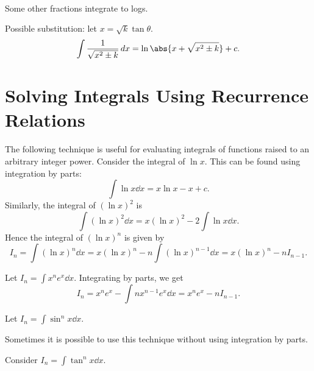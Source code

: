 \documentclass[../multivariate_calculus.tex]{subfiles}
\begin{document}
        \paragraph{}
        Some other fractions integrate to logs.
        \begin{example}
            Possible substitution: let $x=\sqrt{k}\tan\theta$.
            \begin{equation*}
                \int\frac{1}{\sqrt{x^2\pm k}}\,dx = \ln\abs{x+\sqrt{x^2\pm k}}+c.
            \end{equation*}
        \end{example}

    \section{Solving Integrals Using Recurrence Relations}
        \paragraph{}
        The following technique is useful for evaluating integrals of functions raised to an arbitrary integer power.
        Consider the integral of $\ln x$.
        This can be found using integration by parts:
        \begin{equation}
            \int\ln x\dd{x}=x\ln x-x+c.
        \end{equation}
        Similarly, the integral of $(\ln x)^2$ is
        \begin{equation}
            \int(\ln x)^2\dd{x}=x(\ln x)^2-2\int\ln x\dd{x}.
        \end{equation}
        Hence the integral of $(\ln x)^n$ is given by
        \begin{equation}
            I_n=\int(\ln x)^n\dd{x}=x(\ln x)^n-n\int(\ln x)^{n-1}\dd{x}=x(\ln x)^n-nI_{n-1}.
        \end{equation}
        \begin{example}
            Let $I_n=\int x^ne^x\dd{x}$.
            Integrating by parts, we get
            \begin{equation}
                I_n=x^ne^x-\int nx^{n-1}e^x\dd{x}=x^ne^x-nI_{n-1}.
            \end{equation}
        \end{example}
        \begin{example}
            Let $I_n=\int\sin^nx\dd{x}$.
        \end{example}
        Sometimes it is possible to use this technique without using integration by parts.
        \begin{example}
            Consider $I_n=\int\tan^nx\dd{x}$.
        \end{example}
\end{document}
